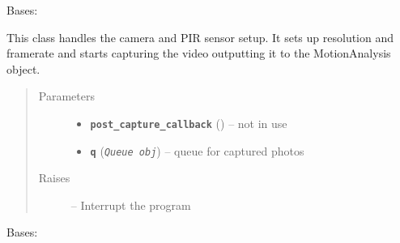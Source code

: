 \documentclass[letterpaper,10pt,english]{sphinxmanual}
\begin{document}
\begin{fulllineitems}
\label{rpicameramon:rpicameramon.motion.PiMotion}
Bases: 

This class handles the camera and PIR sensor setup.
It sets up resolution and framerate and starts
capturing the video outputting it to the MotionAnalysis object.
\begin{quote}\begin{description}
\item[{Parameters}] \leavevmode\begin{itemize}
\item {} 
\textbf{\texttt{post\_capture\_callback}} ({\hyperref[rpicameramon:rpicameramon.motion.CaptureHandler.callback]{}}) -- not in use

\item {} 
\textbf{\texttt{q}} (\emph{\texttt{Queue obj}}) -- queue for captured photos

\end{itemize}

\item[{Raises}] \leavevmode
{} -- Interrupt the program

\end{description}\end{quote}

\begin{fulllineitems}
\label{rpicameramon:rpicameramon.motion.PiMotion.start}
\end{fulllineitems}


\end{fulllineitems}


\begin{fulllineitems}
\label{rpicameramon:rpicameramon.motion.SMSHandler}
Bases: 

\begin{fulllineitems}
\label{rpicameramon:rpicameramon.motion.SMSHandler.handle_sms}
\end{fulllineitems}


\end{fulllineitems}
\end{document}
